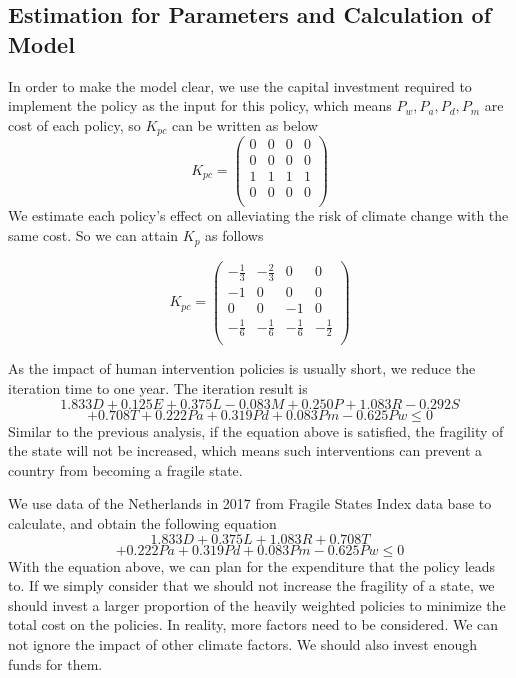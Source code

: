 \documentclass{mcmthesis}
\begin{document}
	\subsection{Estimation for Parameters and Calculation of Model}
	In order to make the model clear, we use the capital investment required to implement the policy as the input for this policy, which means $P_w, P_a, P_d, P_m$ are cost of each policy, so $K_{pc}$ can be written as below
	$$
	K_{pc} = 
	\left(
	\begin{matrix}
		0 & 0 & 0 & 0 \\
		0 & 0 & 0 & 0 \\
		1 & 1 & 1 & 1 \\
		0 & 0 & 0 & 0 \\
	\end{matrix}
	\right)
	$$
	We estimate each policy's effect on alleviating the risk of climate change with the same cost. So we can attain $K_p$ as follows
	\begin{spacing}{1.5}
		$$
		K_{pc}=
		\left(
		\begin{matrix}
		-\frac{1}{3} & -\frac{2}{3} & 0 & 0 \\
		-1 & 0 & 0 & 0 \\
		0 & 0 & -1 & 0 \\
		-\frac{1}{6} & -\frac{1}{6} & -\frac{1}{6} & -\frac{1}{2} \\
		\end{matrix}
		\right)
		$$
	\end{spacing}
	As the impact of human intervention policies is usually short, we reduce the iteration time to one year. The iteration result is
	$$
	1.833D + 0.125E + 0.375L - 0.083M + 0.250P + 1.083R - 0.292S 
	$$
	$$
	 + 0.708T + 0.222Pa + 0.319Pd + 0.083Pm - 0.625Pw \leq 0
	$$
	Similar to the previous analysis, if the equation above is satisfied, the fragility of the state will not be increased, which means such interventions can prevent a country from becoming a fragile state.
	
	We use data of the Netherlands in 2017 from Fragile States Index data base to calculate, and obtain the following equation
	$$
	1.833D + 0.375L + 1.083R + 0.708T
	$$
	$$
	 + 0.222Pa + 0.319Pd + 0.083Pm - 0.625Pw \leq 0
	$$
	With the equation above, we can plan for the expenditure that the policy leads to. If we simply consider that we should not increase the fragility of a state, we should invest a larger proportion of the heavily weighted policies to minimize the total cost on the policies. In reality, more factors need to be considered. We can not ignore the impact of other climate factors. We should also invest enough funds for them.
	
\end{document}
